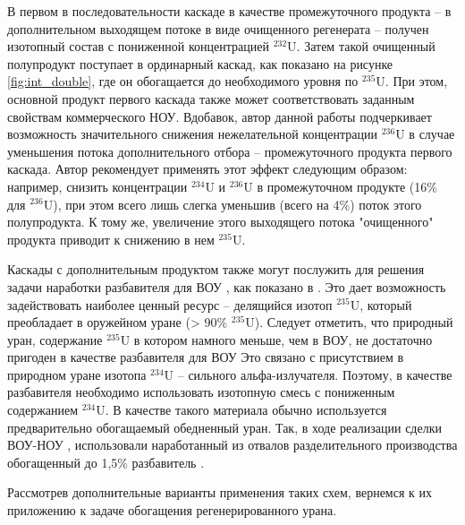 В первом в последовательности каскаде в качестве промежуточного продукта -- в дополнительном выходящем потоке в виде очищенного регенерата -- получен изотопный состав с пониженной концентрацией $^{232}$U.
Затем такой очищенный полупродукт поступает в ординарный каскад, как показано на рисунке \ref{fig:int_double}, где он обогащается до необходимого уровня по $^{235}$U.
При этом, основной продукт первого каскада также может соответствовать заданным свойствам коммерческого НОУ.
Вдобавок, автор данной работы подчеркивает возможность значительного снижения нежелательной концентрации $^{236}$U в случае уменьшения потока дополнительного отбора -- промежуточного продукта первого каскада.
Автор рекомендует применять этот эффект следующим образом: например, снизить концентрации  $^{234}$U и  $^{236}$U в промежуточном продукте (16\% для  $^{236}$U), при этом всего лишь слегка уменьшив (всего на 4\%) поток этого полупродукта.
К тому же, увеличение этого выходящего потока "очищенного" продукта приводит к снижению в нем $^{235}$U.

Каскады с дополнительным продуктом также могут послужить для решения задачи наработки разбавителя для ВОУ \cite{palkinPOLUChENIERAZBAVITELYaDLYa2017}, как показано в \cite{shopenSposobPolucheniyaRazbavitelya2008}.
Это дает возможность задействовать наиболее ценный ресурс -- делящийся изотоп $^{235}$U, который преобладает в оружейном уране (> 90\% $^{235}$U).
Следует отметить, что природный уран, содержание $^{235}$U в котором намного меньше, чем в ВОУ, не достаточно пригоден в качестве разбавителя для ВОУ
Это связано с присутствием в природном уране изотопа $^{234}$U -- сильного альфа-излучателя.
Поэтому, в качестве разбавителя необходимо использовать изотопную смесь с пониженным содержанием $^{234}$U.
В качестве такого материала обычно используется предварительно обогащаемый обедненный уран.
Так, в ходе реализации сделки ВОУ-НОУ \cite{korotkevichRealizaciyaProgrammyVOUNOU2003}, использовали наработанный из отвалов разделительного производства обогащенный до 1,5\% разбавитель \cite{SposobPolucheniyaRazbavitelya}.

Рассмотрев дополнительные варианты применения таких схем, вернемся к их приложению к задаче обогащения регенерированного урана.


